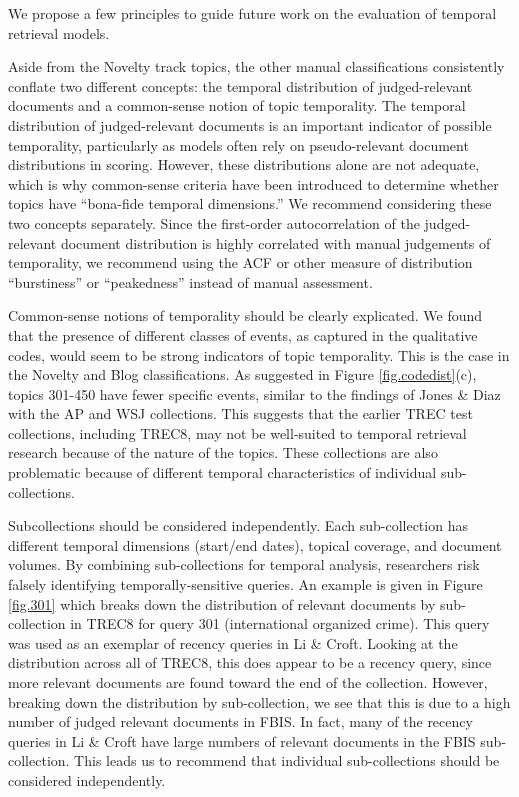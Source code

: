 \documentclass[runningheads,a4paper]{llncs}
\begin{document}
We propose a few principles to guide future work on the evaluation of temporal retrieval models.

Aside from the Novelty track topics, the other manual classifications consistently conflate two different concepts: the temporal distribution of judged-relevant documents and a common-sense notion of topic temporality. The temporal distribution of judged-relevant documents is an important indicator of possible temporality, particularly as models often rely on pseudo-relevant document distributions in scoring. However, these distributions alone are not adequate, which is why common-sense criteria have been introduced to determine whether topics have ``bona-fide temporal dimensions.'' We recommend considering these two concepts separately.  Since the first-order autocorrelation of the judged-relevant document distribution is highly correlated with manual judgements of temporality, we recommend using the ACF or other measure of distribution ``burstiness'' or ``peakedness'' instead of manual assessment.  

Common-sense notions of temporality should be clearly explicated.  We found that the presence of different classes of events, as captured in the qualitative codes, would seem to be strong indicators of topic temporality.  This is the case in the Novelty and Blog classifications. As suggested in Figure \ref{fig.codedist}(c), topics 301-450 have fewer specific events, similar to the findings of Jones \& Diaz with the AP and WSJ collections. This suggests that the earlier TREC test collections, including TREC8, may not be well-suited to temporal retrieval research because of the nature of the topics. These collections are also problematic because of different temporal characteristics of individual sub-collections.

Subcollections should be considered independently. Each sub-collection has different temporal dimensions (start/end dates), topical coverage, and document volumes. By combining sub-collections for temporal analysis, researchers risk falsely identifying temporally-sensitive queries. An example is given in Figure \ref{fig.301} which breaks down the distribution of relevant documents by sub-collection in TREC8 for query 301 (international organized crime). This query was used as an exemplar of recency queries in Li \& Croft. Looking at the distribution across all of TREC8, this does appear to be a recency query, since more relevant documents are found toward the end of the collection. However, breaking down the distribution by sub-collection, we see that this is due to a high number of judged relevant documents in FBIS.  In fact, many of the recency queries in Li \& Croft have large numbers of relevant documents in the FBIS sub-collection.    This leads us to recommend that individual sub-collections should be considered independently.
\end{document}

